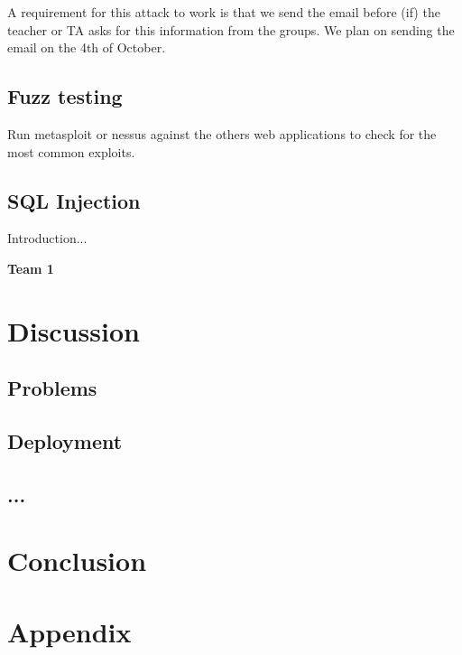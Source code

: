 \documentclass[a4paper]{article}
\begin{document}
A requirement for this attack to work is that we send the email before (if) the teacher or TA asks for this information from the groups. We plan on sending the email on the 4th of October.

\subsection{Fuzz testing}
Run metasploit or nessus against the others web applications to check for the most common exploits.

\subsection{SQL Injection}
Introduction...

\textbf{Team 1}



\section{Discussion}
\subsection{Problems}
\subsection{Deployment}

\subsection{...}


\section{Conclusion}

\section{Appendix}

\end{document}
